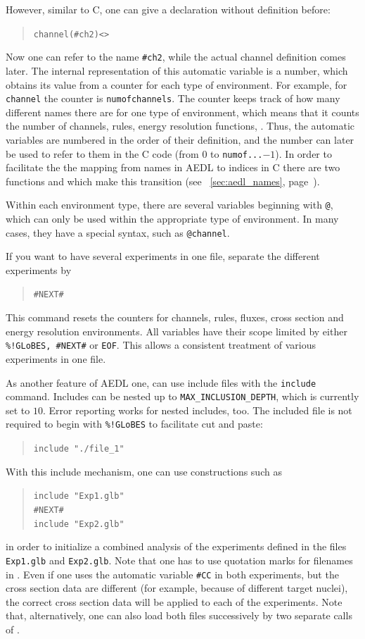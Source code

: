 However, similar to C, one can give a declaration without definition before:
\begin{quote}
{\tt    channel(\#ch2)<>}
\end{quote}
Now one can refer to the name {\tt \#ch2}, while the actual channel definition comes later. The internal representation of this automatic
variable is a number, which obtains its value from a counter for each type of environment. For example, for {\tt channel} the counter is {\tt numofchannels}. The counter keeps track of how many different names 
there are for one type of environment, which means that it counts the number of channels, rules, energy resolution functions, \etc . Thus, the automatic
variables are numbered in the order of their definition, and the number
can later be used to refer to them in the C code (from $0$ to {\tt numof...}$-1$). In order to facilitate the the mapping from names in AEDL to indices
in C there are two functions  and  which
make this transition (see \Sec~\ref{sec:aedl_names}, 
page~\pageref{sec:aedl_names}).


Within each environment type, there are several 
variables beginning with {\tt @}, which can only be used within the 
appropriate type of environment. In many cases, 
they have a special syntax, such as {\tt @channel}.

If you want to have several experiments in one file, separate the different
 experiments by 
\begin{quote}
{\tt    \#NEXT\#}
\end{quote}
This command resets the counters for channels, rules, fluxes, cross section 
and energy resolution environments. All variables have their scope limited 
by either {\tt \%!GLoBES, \#NEXT\#} or {\tt EOF}.  This allows 
a consistent treatment of various experiments in one file.

As another feature of AEDL one, can use include files with the {\tt include} command. Includes can be nested up to {\tt MAX\_INCLUSION\_DEPTH}, which is currently set to $10$. Error reporting works 
 for nested includes, too. The included file is not required to begin 
 with {\tt \%!GLoBES} to facilitate cut and paste:
\begin{quote}
{\tt include "./file\_1"}
\end{quote}
With this include mechanism, one can use constructions such as 
\begin{quote}
{\tt    include  "Exp1.glb"\\
        \#NEXT\#\\
        include   "Exp2.glb"
}
\end{quote}
in order to initialize a combined analysis of the experiments defined in the files {\tt Exp1.glb} and {\tt Exp2.glb}. Note that one has 
to use quotation marks for filenames in \AEDL.
Even if one uses the
automatic variable {\tt \#CC} in both experiments, 
but the cross section data are different (for example, because of different target nuclei), the correct 
cross section data will be applied to each of the experiments. 
Note that, alternatively, one can 
also load both files successively by two separate calls of 
. 

